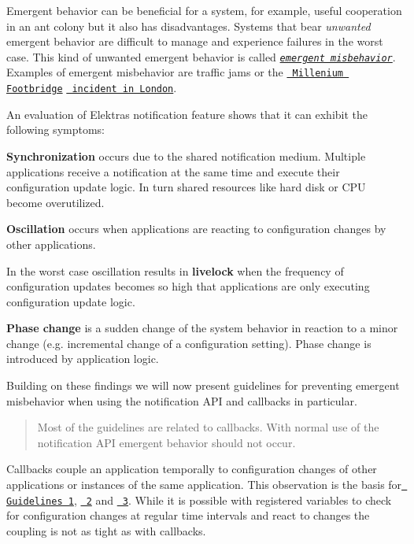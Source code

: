 Emergent behavior can be beneficial for a system, for example, useful cooperation in an ant colony but it also has disadvantages. Systems that bear {\itshape unwanted} emergent behavior are difficult to manage and experience failures in the worst case. This kind of unwanted emergent behavior is called \href{http://www.hpl.hp.com/techreports/2006/HPL-2006-2.html}{\texttt{ {\itshape emergent misbehavior}}}. Examples of emergent misbehavior are traffic jams or the \href{https://researchcourse.pbworks.com/f/structural+engineering.pdf}{\texttt{ Millenium Footbridge}} \href{https://www.sciencedaily.com/releases/2005/11/051103080801.htm}{\texttt{ incident in London}}.

An evaluation of Elektra\textquotesingle{}s notification feature shows that it can exhibit the following symptoms\+:


\begin{DoxyItemize}
\item {\bfseries{Synchronization}} occurs due to the shared notification medium. Multiple applications receive a notification at the same time and execute their configuration update logic. In turn shared resources like hard disk or C\+PU become overutilized.
\item {\bfseries{Oscillation}} occurs when applications are reacting to configuration changes by other applications.
\item In the worst case oscillation results in {\bfseries{livelock}} when the frequency of configuration updates becomes so high that applications are only executing configuration update logic.
\item {\bfseries{Phase change}} is a sudden change of the system behavior in reaction to a minor change (e.\+g. incremental change of a configuration setting). Phase change is introduced by application logic.
\end{DoxyItemize}

Building on these findings we will now present guidelines for preventing emergent misbehavior when using the notification A\+PI and callbacks in particular.

\begin{quote}
Most of the guidelines are related to callbacks. With normal use of the notification A\+PI emergent behavior should not occur. \end{quote}


Callbacks couple an application temporally to configuration changes of other applications or instances of the same application. This observation is the basis for \href{\#guideline-1-avoid-callbacks}{\texttt{ Guidelines 1}}, \href{\#guideline-2-wait-before-reacting-to-changes}{\texttt{ 2}} and \href{\#guideline-3-avoid-updates-as-reaction-to-change}{\texttt{ 3}}. While it is possible with registered variables to check for configuration changes at regular time intervals and react to changes the coupling is not as tight as with callbacks.

